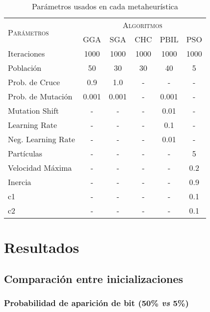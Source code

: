 \begin{table}[h!]
\centering
\begin{tabular}{l c c c c c}
\hline
\multirow{2}{*}{\textsc{Parámetros}}
	& \multicolumn{5}{c}{\textsc{Algoritmos}} \\\cline{2-6}
	& GGA & SGA & CHC & PBIL & PSO \\
\hline
\hline
Iteraciones        &  1000 &  1000 &  1000 &  1000 &  1000 \\
Población          &    50 &    30 &    30 &    40 &     5 \\
Prob. de Cruce     &   0.9 &   1.0 &     - &     - &     - \\
Prob. de Mutación  & 0.001 & 0.001 &     - & 0.001 &     - \\
Mutation Shift     &     - &     - &     - &  0.01 &     - \\
Learning Rate      &     - &     - &     - &   0.1 &     - \\
Neg. Learning Rate &     - &     - &     - &  0.01 &     - \\
Partículas         &     - &     - &     - &     - &     5 \\
Velocidad Máxima   &     - &     - &     - &     - &   0.2 \\
Inercia            &     - &     - &     - &     - &   0.9 \\
c1                 &     - &     - &     - &     - &   0.1 \\
c2                 &     - &     - &     - &     - &   0.1 \\
\hline
\end{tabular}
\caption{Parámetros usados en cada metaheurística}
\label{table-parameters}
\end{table}

\section{Resultados}

\blindtext

\subsection{Comparación entre inicializaciones}

\blindtext

\subsubsection{Probabilidad de aparición de bit (50\% \emph{vs} 5\%)}


